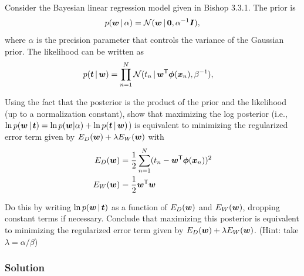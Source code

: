 \documentclass[submit]{harvardml}
\begin{document}
\newpage
\begin{problem}
Consider the Bayesian linear regression model given in Bishop 3.3.1. The prior is
\begin{align*}
p(\boldsymbol{w} \,|\, \alpha) = \mathcal{N}(\boldsymbol{w} \,|\, \bold0, \alpha^{-1}\boldsymbol{I} ),
\end{align*}
where $\alpha$ is the precision parameter that controls the variance of the Gaussian prior.  The likelihood can be written as
\begin{align*}
p(\boldsymbol{t} \,|\, \boldsymbol{w}) &= \prod_{n=1}^N \mathcal{N}(t_n \,|\, \boldsymbol{w}^{\mathsf{T}} \boldsymbol{\phi}(\boldsymbol{x}_n), \beta^{-1}),
\end{align*}

Using the fact that the posterior is the product of the prior and the likelihood (up to a normalization constant), show that maximizing the log posterior (i.e., $\ln p(\boldsymbol{w} \,|\, \boldsymbol{t})= \ln p(\boldsymbol{w} | \alpha) + \ln p(\boldsymbol{t} \,|\, \boldsymbol{w})$) is equivalent to minimizing the regularized error term given by ${E_D(\boldsymbol{w}) + \lambda E_W(\boldsymbol{w})}$ with 
\begin{align*}
E_D(\boldsymbol{w}) &= \frac{1}{2}\sum_{n = 1}^N (t_n - \boldsymbol{w}^{\mathsf{T}} \boldsymbol{\phi}(\boldsymbol{x}_n))^2 \\
E_W(\boldsymbol{w}) &= \frac{1}{2}\boldsymbol{w}^{\mathsf{T}} \boldsymbol{w}
\end{align*} 

Do this by writing $\ln p(\boldsymbol{w} \,|\, \boldsymbol{t})$ as a function of $E_D(\boldsymbol{w})$ and $E_W(\boldsymbol{w})$, dropping constant terms if necessary.  Conclude that maximizing this posterior is equivalent to minimizing the regularized error term given by $E_D(\boldsymbol{w}) + \lambda E_W(\boldsymbol{w})$. (Hint: take $\lambda = \alpha/\beta$)
\end{problem}
\subsubsection*{Solution}
\end{document}
